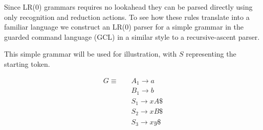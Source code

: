 \documentclass[a4paper,11pt]{article}
\begin{document}
Since LR(0) grammars requires no lookahead they can be parsed directly using only recognition and reduction actions.
To see how these rules translate into a familiar language we construct an LR(0) parser for a simple grammar in the guarded command language (GCL) in a similar style to a recursive-ascent parser.

This simple grammar will be used for illustration, with $S$ representing the starting token.

\begin{align*}
G \equiv \quad & A_1 \rightarrow a\\
               & B_1 \rightarrow b\\
               & S_1 \rightarrow x A \$\\
               & S_2 \rightarrow x B \$\\
               & S_3 \rightarrow x y \$
\end{align*}
\end{document}
